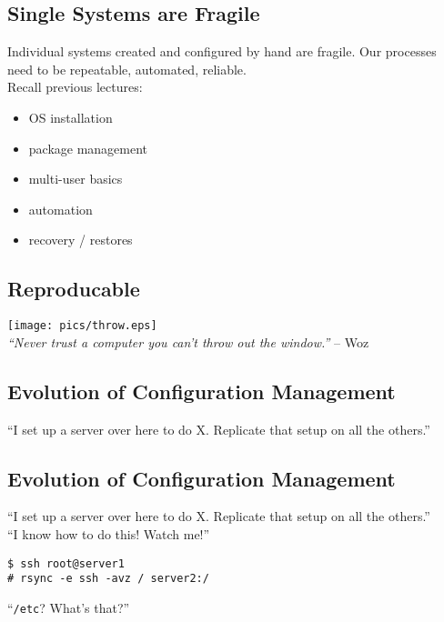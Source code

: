 \documentclass[xga]{xdvislides}
\begin{document}
\subsection{Single Systems are Fragile}
Individual systems created and configured by hand are
fragile.  Our processes need to be repeatable,
automated, reliable. \\

Recall previous lectures:

\begin{itemize}
	\item OS installation
	\item package management
	\item multi-user basics
	\item automation
	\item recovery / restores
\end{itemize}

\subsection{Reproducable}
\vspace*{\fill}
\begin{center}
	\texttt{[image: pics/throw.eps]} \\
	\vspace*{\fill}
	{\em ``Never trust a computer you can't throw out the
window.''} -- Woz
\end{center}

\subsection{Evolution of Configuration Management}
``I set up a server over here to do X.  Replicate that
setup on all the others.'' \\

\subsection{Evolution of Configuration Management}
``I set up a server over here to do X.  Replicate that
setup on all the others.'' \\

``I know how to do this!  Watch me!'' \\
\begin{verbatim}
$ ssh root@server1
# rsync -e ssh -avz / server2:/
\end{verbatim}
\vspace{.5in}
``{\tt /etc}?  What's that?''
\end{document}
